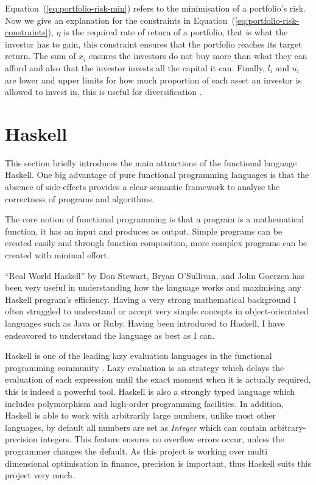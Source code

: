   Equation~(\ref{eq:portfolio-risk-min}) refers to the minimisation of a portfolio's risk. Now we give an explanation for the constraints in Equation~(\ref{eq:portfolio-risk-constraints}), $\eta$ is the required rate of return of a portfolio, that is what the investor has to gain, this constraint ensures that the portfolio reaches its target return. The sum of $x_i$ ensures the investors do not buy more than what they can afford and also that the investor invests all the capital it can. Finally, $l_i$ and $u_i$ are lower and upper limits for how much proportion of each asset an investor is allowed to invest in, this is useful for diversification \cite{diversification}. 

  
  \section{Haskell} %
  \label{sec:haskell}
  This section briefly introduces the main attractions of the functional language Haskell. One big advantage of pure functional programming languages is that the absence of side-effects provides a clear semantic framework to analyse the correctness of programs and algorithms.

  The core notion of functional programming is that a program is a mathematical function, it has an input and produces as output. Simple programs can be created easily and through function composition, more complex programs can be created with minimal effort.  

  ``Real World Haskell'' by Don Stewart, Bryan O'Sullivan, and John Goerzen has been very useful in understanding how the language works and maximising any Haskell program's efficiency. Having a very strong mathematical background I often struggled to understand or accept very simple concepts in object-orientated languages such as Java or Ruby. Having been introduced to Haskell, I have endeavored to understand the language as best as I can. 

  Haskell is one of the leading lazy evaluation languages in the functional programming community \cite{lazy}. Lazy evaluation is an strategy which delays the evaluation of each expression until the exact moment when it is actually required, this is indeed a powerful tool. Haskell is also a strongly typed language which includes polymorphism and high-order programming facilities. In addition, Haskell is able to work with arbitrarily large numbers, unlike most other languages, by default all numbers are set as \textit{Integer} which can contain arbitrary-precision integers. This feature ensures no overflow errors occur, unless the programmer changes the default. As this project is working over multi dimensional optimisation in finance, precision is important, thus Haskell suits this project very much.

